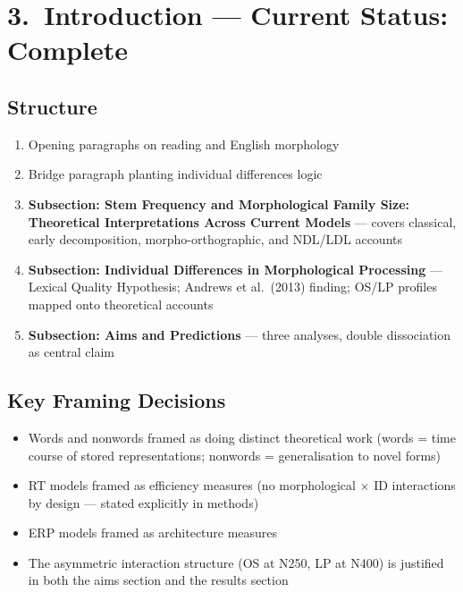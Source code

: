 \documentclass[11pt, a4paper]{article}
\begin{document}
\section{3.\ Introduction — Current Status: Complete}

\subsection{Structure}
\begin{enumerate}[leftmargin=1.5em]
  \item Opening paragraphs on reading and English morphology
  \item Bridge paragraph planting individual differences logic
  \item \textbf{Subsection: Stem Frequency and Morphological Family Size: Theoretical Interpretations Across Current Models} — covers classical, early decomposition, morpho-orthographic, and NDL/LDL accounts
  \item \textbf{Subsection: Individual Differences in Morphological Processing} — Lexical Quality Hypothesis; Andrews et al.\ (2013) finding; OS/LP profiles mapped onto theoretical accounts
  \item \textbf{Subsection: Aims and Predictions} — three analyses, double dissociation as central claim
\end{enumerate}

\subsection{Key Framing Decisions}

\begin{itemize}[leftmargin=1.5em]
  \item Words and nonwords framed as doing distinct theoretical work (words = time course of stored representations; nonwords = generalisation to novel forms)
  \item RT models framed as efficiency measures (no morphological $\times$ ID interactions by design — stated explicitly in methods)
  \item ERP models framed as architecture measures
  \item The asymmetric interaction structure (OS at N250, LP at N400) is justified in both the aims section and the results section
\end{itemize}

\end{document}
